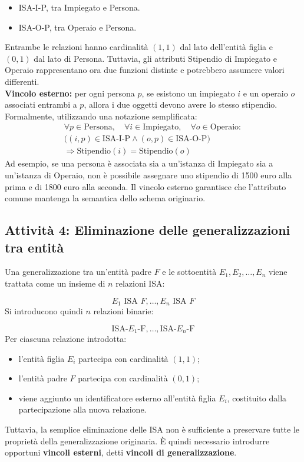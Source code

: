 \begin{itemize}
    \item ISA-I-P, tra Impiegato e Persona.
    \item ISA-O-P, tra Operaio e Persona.
\end{itemize}
\noindent
Entrambe le relazioni hanno cardinalità $(1,1)$
dal lato dell'entità figlia e $(0,1)$ dal lato
di Persona.
Tuttavia, gli attributi Stipendio di Impiegato
e Operaio rappresentano ora due funzioni distinte
e potrebbero assumere valori differenti.\medskip\\
\noindent
\textbf{Vincolo esterno:} per ogni persona $p$,
se esistono un impiegato $i$ e un operaio $o$
associati entrambi a $p$, allora i due oggetti
devono avere lo stesso stipendio.
Formalmente, utilizzando una notazione semplificata:
\[
\begin{aligned}
\forall p\in\text{Persona},\quad
\forall i\in\text{Impiegato},\quad
\forall o\in\text{Operaio}:\\
\big((i,p)\in\text{ISA-I-P}
\land
(o,p)\in\text{ISA-O-P}\big)\\
\Longrightarrow
\text{Stipendio}(i)=\text{Stipendio}(o)
\end{aligned}
\]
Ad esempio, se una persona è associata sia
a un'istanza di Impiegato sia a un'istanza
di Operaio, non è possibile assegnare
uno stipendio di 1500 euro alla prima
e di 1800 euro alla seconda.
Il vincolo esterno garantisce che l'attributo
comune mantenga la semantica dello schema
originario.
\subsection{Attività 4: Eliminazione delle generalizzazioni tra entità}

Una generalizzazione tra un'entità padre $F$ e le
sottoentità $E_1,E_2,\ldots,E_n$ viene trattata
come un insieme di $n$ relazioni ISA:

\[
E_1 \text{ ISA } F,\ldots,E_n \text{ ISA } F
\]
Si introducono quindi $n$ relazioni binarie:

\[
\text{ISA-}E_1\text{-F},\ldots,
\text{ISA-}E_n\text{-F}
\]
Per ciascuna relazione introdotta:

\begin{itemize}
    \item l'entità figlia $E_i$ partecipa con
    cardinalità $(1,1)$;
    \item l'entità padre $F$ partecipa con
    cardinalità $(0,1)$;
    \item viene aggiunto un identificatore esterno
    all'entità figlia $E_i$, costituito dalla
    partecipazione alla nuova relazione.
\end{itemize}
\noindent
Tuttavia, la semplice eliminazione delle ISA non
è sufficiente a preservare tutte le proprietà
della generalizzazione originaria.
È quindi necessario introdurre opportuni
\textbf{vincoli esterni}, detti
\textbf{vincoli di generalizzazione}.

